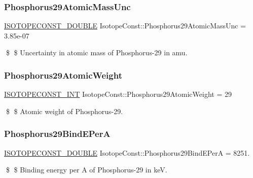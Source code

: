 \subsubsection{\texorpdfstring{Phosphorus29\+Atomic\+Mass\+Unc}{Phosphorus29AtomicMassUnc}}
{\footnotesize\ttfamily \mbox{\hyperlink{group___isotope_const-_macros_ga8f45a7272ce02c0b4c65c44636ed719a}{I\+S\+O\+T\+O\+P\+E\+C\+O\+N\+S\+T\+\_\+\+D\+O\+U\+B\+LE}} Isotope\+Const\+::\+Phosphorus29\+Atomic\+Mass\+Unc = 3.\+85e-\/07}

\$ \$ Uncertainty in atomic mass of Phosphorus-\/29 in amu. \mbox{\label{group___isotope_const-_phosphorus-_p29_gacc714ac592518749ee72526d0023b2fa}} 
\subsubsection{\texorpdfstring{Phosphorus29\+Atomic\+Weight}{Phosphorus29AtomicWeight}}
{\footnotesize\ttfamily \mbox{\hyperlink{group___isotope_const-_macros_ga5f18360b3e99483a35c32d789e62621c}{I\+S\+O\+T\+O\+P\+E\+C\+O\+N\+S\+T\+\_\+\+I\+NT}} Isotope\+Const\+::\+Phosphorus29\+Atomic\+Weight = 29}

\$ \$ Atomic weight of Phosphorus-\/29. \mbox{\label{group___isotope_const-_phosphorus-_p29_ga1c83bed3ae32802357f43a127e6a1dcb}} 
\subsubsection{\texorpdfstring{Phosphorus29\+Bind\+E\+PerA}{Phosphorus29BindEPerA}}
{\footnotesize\ttfamily \mbox{\hyperlink{group___isotope_const-_macros_ga8f45a7272ce02c0b4c65c44636ed719a}{I\+S\+O\+T\+O\+P\+E\+C\+O\+N\+S\+T\+\_\+\+D\+O\+U\+B\+LE}} Isotope\+Const\+::\+Phosphorus29\+Bind\+E\+PerA = 8251.}

\$ \$ Binding energy per A of Phosphorus-\/29 in keV. \mbox{\label{group___isotope_const-_phosphorus-_p29_ga1a9f24fabf86013bc7da362105798091}} 
